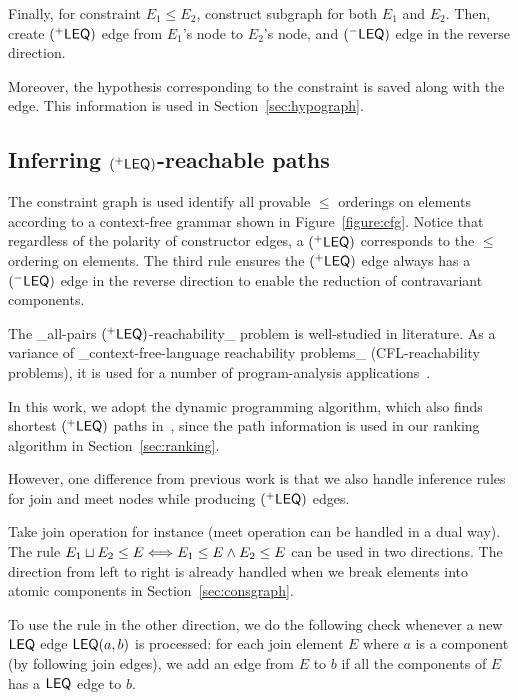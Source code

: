 Finally, for constraint $E_1\leq E_2$, construct subgraph for both
$E_1$ and $E_2$. Then, create $(^{+}\mathsf{LEQ})$ edge from $E_1$'s
node to $E_2$'s node, and $(^{-}\mathsf{LEQ})$ edge in the reverse
direction. 

Moreover, the hypothesis corresponding to the constraint is saved
along with the edge. This information is used in
Section~\ref{sec:hypograph}.

\subsection{Inferring $(^{+}\mathsf{LEQ})$-reachable paths}
\label{sec:leqedge}

The constraint graph is used identify all provable $\leq$ orderings on
elements according to a context-free grammar shown in
Figure~\ref{figure:cfg}. Notice that regardless of the polarity of
constructor edges, a $(^{+}\mathsf{LEQ})$ 
corresponds to the $\leq$ ordering on elements. The third rule ensures
the $(^{+}\mathsf{LEQ})$ edge always has a $(^{-}\mathsf{LEQ})$ edge
in the reverse direction to enable the reduction of contravariant
components.

The _all-pairs $(^{+}\mathsf{LEQ})$-reachability_ problem is
well-studied in literature\cite{melski-cflgraph,barrett-cflpath}. As a
variance of _context-free-language reachability problems_
(CFL-reachability problems), it is used for a number of
program-analysis applications~\cite{reps-graph}. 

In this work, we adopt the dynamic programming algorithm, which also
finds shortest $(^{+}\mathsf{LEQ})$ paths in~\cite{barrett-cflpath},
since the path information is used in our ranking algorithm in
Section~\ref{sec:ranking}.

However, one difference from previous work is that we also handle
inference rules for join and meet nodes while producing
$(^{+}\mathsf{LEQ})$ edges.

Take join operation for instance (meet operation can be handled in a
dual way). The rule $E_1\sqcup E_2\leq E \Longleftrightarrow E_1\leq E \land E_2 \leq
E $ can be used in two directions. The direction from left to right is
already handled when we break elements into atomic components in
Section~\ref{sec:consgraph}.

To use the rule in the other direction, we do the following check
whenever a new $\mathsf{LEQ}$ edge $\mathsf{LEQ}(a,b)$ is processed: for each join
element $E$ where $a$ is a component (by following join edges), we add
an edge from $E$ to $b$ if all the components of $E$ has a $\mathsf{LEQ}$ edge
to $b$. 

